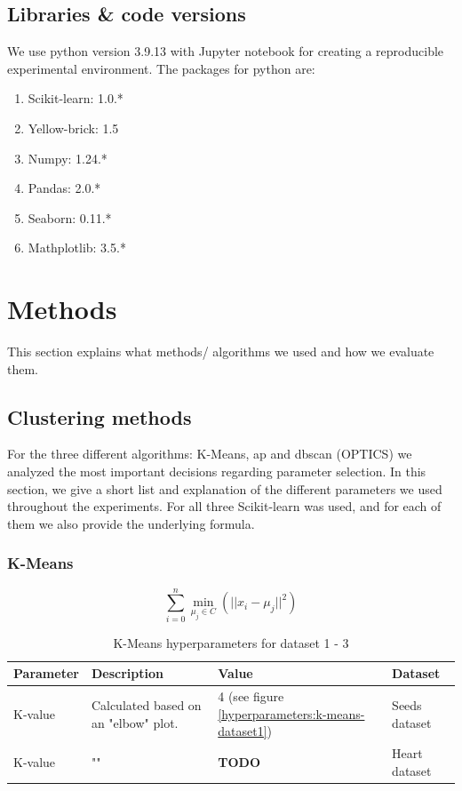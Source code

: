 \subsection{Libraries \& code versions}
We use python version 3.9.13 with Jupyter notebook for creating a reproducible experimental environment.
The packages for python are:
\begin{enumerate}
  \item Scikit-learn: 1.0.*
  \item Yellow-brick: 1.5
  \item Numpy: 1.24.*
  \item Pandas: 2.0.*
  \item Seaborn: 0.11.*
  \item Mathplotlib: 3.5.*
\end{enumerate}

\section{Methods}
This section explains what methods/ algorithms we used and how we evaluate them.
\subsection{Clustering methods}
For the three different algorithms: K-Means, \gls{ap} and \gls{dbscan} (OPTICS) we analyzed the most important decisions regarding parameter selection.
In this section, we give a short list and explanation of the different parameters we used throughout the experiments.
For all three Scikit-learn was used, and for each of them we also provide the underlying formula.
\subsubsection{K-Means}
\begin{equation}
  \sum_{i=0}^{n}\min_{\mu_j \in C}(||x_i - \mu_j||^2)
\end{equation}
\begin{table}[h]
  \begin{tabular}{|l|p{6cm}|l|l|}
    \hline
    Parameter & Description                          & Value                                                 & Dataset       \\ \hline
    K-value   & Calculated based on an "elbow" plot. & 4 (see figure \ref{hyperparameters:k-means-dataset1}) & Seeds dataset \\ \hline
    K-value   & ""                                   & \textbf{TODO}                                         & Heart dataset \\ \hline
    \hline
  \end{tabular}
  \caption{K-Means hyperparameters for dataset 1 - 3}
  \label{tab:kmeans-formula-dataset-2}
\end{table}

